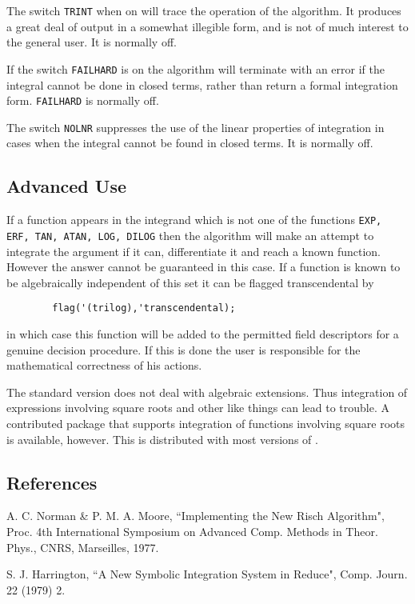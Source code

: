 The switch {\tt TRINT} when on will trace the operation of the algorithm. It
produces a great deal of output in a somewhat illegible form, and is not
of much interest to the general user. It is normally off.

If the switch {\tt FAILHARD} is on the algorithm will terminate with an
error if the integral cannot be done in closed terms, rather than return a
formal integration form. {\tt FAILHARD} is normally off.

The switch {\tt NOLNR} suppresses the use of the linear properties of
integration in cases when the integral cannot be found in closed terms.
It is normally off.

\subsection{Advanced Use}

If a function appears in the integrand which is not one of the functions
{\tt EXP, ERF, TAN, ATAN, LOG, DILOG} then the algorithm will make an attempt to
integrate the argument if it can, differentiate it and reach a known
function. However the answer cannot be guaranteed in this case. If a
function is known to be algebraically independent of this set it can be
flagged transcendental by
\begin{verbatim}
        flag('(trilog),'transcendental);
\end{verbatim}
in which case this function will be added to the permitted field
descriptors for a genuine decision procedure. If this is done the user is
responsible for the mathematical correctness of his actions.

The standard version does not deal with algebraic extensions. Thus
integration of expressions involving square roots and other like things
can lead to trouble. A contributed package that supports integration of
functions involving square roots is available, however. This is
distributed with most versions of {\REDUCE}.


\subsection{References}

        A. C. Norman \& P. M. A. Moore, ``Implementing the New Risch
                Algorithm", Proc. 4th International Symposium on Advanced
                Comp. Methods in Theor. Phys., CNRS, Marseilles, 1977.

        S. J. Harrington, ``A New Symbolic Integration System in Reduce",
                Comp. Journ. 22 (1979) 2.

